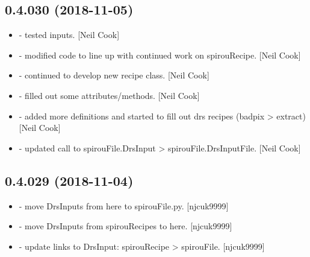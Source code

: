 \documentclass[a4paper,10pt,english]{report}
\begin{document}
\subsection{0.4.030 (2018-11-05)}
\label{\detokenize{misc/changelog:id269}}\begin{itemize}
\item {} 
 - tested  inputs. {[}Neil Cook{]}

\item {} 
 - modified code to line up with continued work on
spirouRecipe. {[}Neil Cook{]}

\item {} 
 - continued to develop new recipe class. {[}Neil Cook{]}

\item {} 
 - filled out some attributes/methods. {[}Neil Cook{]}

\item {} 
 - added more definitions and started to fill out drs
recipes (badpix \textendash{}\textgreater{} extract) {[}Neil Cook{]}

\item {} 
 - updated call to spirouFile.DrsInput \textendash{}\textgreater{}
spirouFile.DrsInputFile. {[}Neil Cook{]}

\end{itemize}


\subsection{0.4.029 (2018-11-04)}
\label{\detokenize{misc/changelog:id270}}\begin{itemize}
\item {} 
 - move DrsInputs from here to spirouFile.py.
{[}njcuk9999{]}

\item {} 
 - move DrsInputs from spirouRecipes to here. {[}njcuk9999{]}

\item {} 
 - update links to DrsInput: spirouRecipe \textendash{}\textgreater{}
spirouFile. {[}njcuk9999{]}

\end{itemize}
\end{document}
